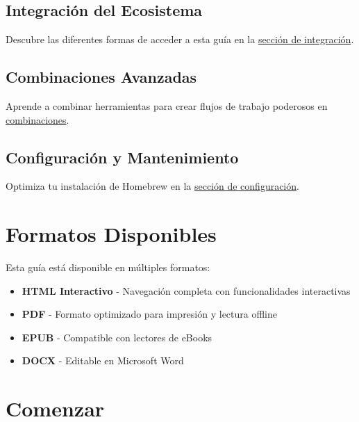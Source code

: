 \documentclass[
  11pt,
  letterpaper,
  oneside,
  openany]{scrbook}
\providecommand{\tightlist}{%
  \setlength{\itemsep}{0pt}\setlength{\parskip}{0pt}}
\begin{document}
\subsection*{Integración del
Ecosistema}\label{integraciuxf3n-del-ecosistema}

Descubre las diferentes formas de acceder a esta guía en la
\href{ecosystem-integration.qmd}{sección de integración}.

\subsection*{Combinaciones Avanzadas}\label{combinaciones-avanzadas}

Aprende a combinar herramientas para crear flujos de trabajo poderosos
en \href{combinaciones.qmd}{combinaciones}.

\subsection*{Configuración y
Mantenimiento}\label{configuraciuxf3n-y-mantenimiento}

Optimiza tu instalación de Homebrew en la
\href{configuracion.qmd}{sección de configuración}.

\section*{Formatos Disponibles}\label{formatos-disponibles}


Esta guía está disponible en múltiples formatos:

\begin{itemize}
\tightlist
\item
  \textbf{HTML Interactivo} - Navegación completa con funcionalidades
  interactivas
\item
  \textbf{PDF} - Formato optimizado para impresión y lectura offline
\item
  \textbf{EPUB} - Compatible con lectores de eBooks
\item
  \textbf{DOCX} - Editable en Microsoft Word
\end{itemize}

\section*{Comenzar}\label{comenzar}
\end{document}

